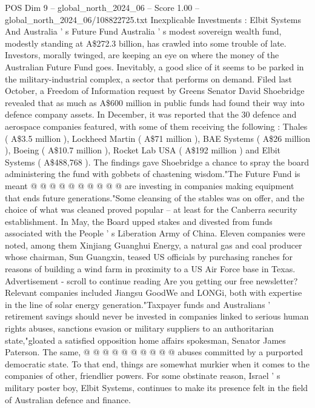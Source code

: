 \begin{textsample}{POS Dim 9 – global\_north\_2024\_06 – Score 1.00 – global\_north\_2024\_06/108822725.txt}  \label{ex:f9_pos_283}
Inexplicable Investments : Elbit Systems And Australia ' s Future Fund Australia ' s modest sovereign wealth fund, modestly standing at A\$272.3 billion, has crawled into some trouble of late.
Investors, morally twinged, are keeping an eye on where the money of the Australian Future Fund goes.
Inevitably, a good slice of it seems to be parked in the military-industrial complex, a sector that performs on demand.
Filed last October, a Freedom of Information request by Greens Senator David Shoebridge revealed that as much as A\$600 million in public funds had found their way into defence company assets.
In December, it was reported that the 30 defence and aerospace companies featured, with some of them receiving the following : Thales ( A\$3.5 million ), Lockheed Martin ( A\$71 million ), BAE Systems ( A\$26 million ), Boeing ( A\$10.7 million ), Rocket Lab USA ( A\$192 million ) and Elbit Systems ( A\$488,768 ).
The findings gave Shoebridge a chance to spray the board administering the fund with gobbets of chastening wisdom."The Future Fund is meant @ @ @ @ @ @ @ @ @ @ are investing in companies making equipment that ends future generations."Some cleansing of the stables was on offer, and the choice of what was cleaned proved popular -- at least for the Canberra security establishment.
In May, the Board upped stakes and divested from funds associated with the People ' s Liberation Army of China.
Eleven companies were noted, among them Xinjiang Guanghui Energy, a natural gas and coal producer whose chairman, Sun Guangxin, teased US officials by purchasing ranches for reasons of building a wind farm in proximity to a US Air Force base in Texas.
Advertisement - scroll to continue reading Are you getting our free newsletter?
Relevant companies included Jiangsu GoodWe and LONGi, both with expertise in the line of solar energy generation."Taxpayer funds and Australians ' retirement savings should never be invested in companies linked to serious human rights abuses, sanctions evasion or military suppliers to an authoritarian state,"gloated a satisfied opposition home affairs spokesman, Senator James Paterson.
The same, @ @ @ @ @ @ @ @ @ @ abuses committed by a purported democratic state.
To that end, things are somewhat murkier when it comes to the companies of other, friendlier powers.
For some obstinate reason, Israel ' s military poster boy, Elbit Systems, continues to make its presence felt in the field of Australian defence and finance.

\end{textsample}
